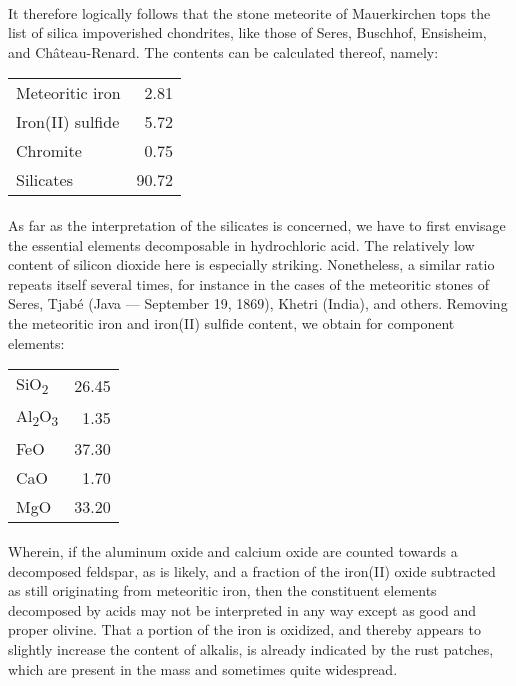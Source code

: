 \documentclass[a4paper, 12pt, oneside]{article}
\begin{document}
\paragraph*{}
It therefore logically follows that the stone meteorite of Mauerkirchen tops the list of silica impoverished chondrites, like those of Seres, Buschhof, Ensisheim, and Château-Renard. The contents can be calculated thereof, namely:
\begin{center}
    \begin{tabular}{l r}
        Meteoritic iron & 2.81\\
        Iron(II) sulfide & 5.72\\
        Chromite & 0.75\\
        Silicates & 90.72\\
    \end{tabular}
\end{center}
\paragraph*{}
As far as the interpretation of the silicates is concerned, we have to first envisage the essential elements decomposable in hydrochloric acid. The relatively low content of silicon dioxide here is especially striking. Nonetheless, a similar ratio repeats itself several times, for instance in the cases of the meteoritic stones of Seres, Tjabé (Java --- September 19, 1869), Khetri (India), and others. Removing the meteoritic iron and iron(II) sulfide content, we obtain for component elements:
\begin{center}
    \begin{tabular}{l r}
        SiO\textsubscript{2} & 26.45\\
        Al\textsubscript{2}O\textsubscript{3} & 1.35\\
        FeO & 37.30\\
        CaO & 1.70\\
        MgO & 33.20\\
    \end{tabular}
\end{center}
\paragraph*{}
Wherein, if the aluminum oxide and calcium oxide are counted towards a decomposed feldspar, as is likely, and a fraction of the iron(II) oxide subtracted as still originating from meteoritic iron, then the constituent elements decomposed by acids may not be interpreted in any way except as good and proper olivine. That a portion of the iron is oxidized, and thereby appears to slightly increase the content of alkalis, is already indicated by the rust patches, which are present in the mass and sometimes quite widespread.
\end{document}
